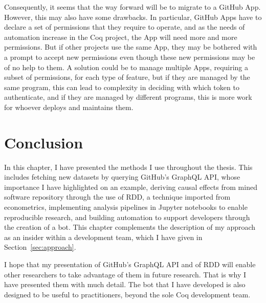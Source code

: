 Consequently, it seems that the way forward will be to migrate to a GitHub App.
However, this may also have some drawbacks.
In particular, GitHub Apps have to declare a set of permissions that they require to operate, and as the needs of automation increase in the Coq project, the App will need more and more permissions.
But if other projects use the same App, they may be bothered with a prompt to accept new permissions even though these new permissions may be of no help to them.
A solution could be to manage multiple Apps, requiring a subset of permissions, for each type of feature, but if they are managed by the same program, this can lead to complexity in deciding with which token to authenticate, and if they are managed by different programs, this is more work for whoever deploys and maintains them.

\section{Conclusion}

In this chapter, I have presented the methods I use throughout the thesis.
This includes fetching new datasets by querying GitHub's GraphQL API, whose importance I have highlighted on an example, deriving causal effects from mined software repository through the use of RDD, a technique imported from econometrics, implementing analysis pipelines in Jupyter notebooks to enable reproducible research, and building automation to support developers through the creation of a bot.
This chapter complements the description of my approach as an insider within a development team, which I have given in Section~\ref{sec:approach}.

I hope that my presentation of GitHub's GraphQL API and of RDD will enable other researchers to take advantage of them in future research.
That is why I have presented them with much detail.
The bot that I have developed is also designed to be useful to practitioners, beyond the sole Coq development team.
